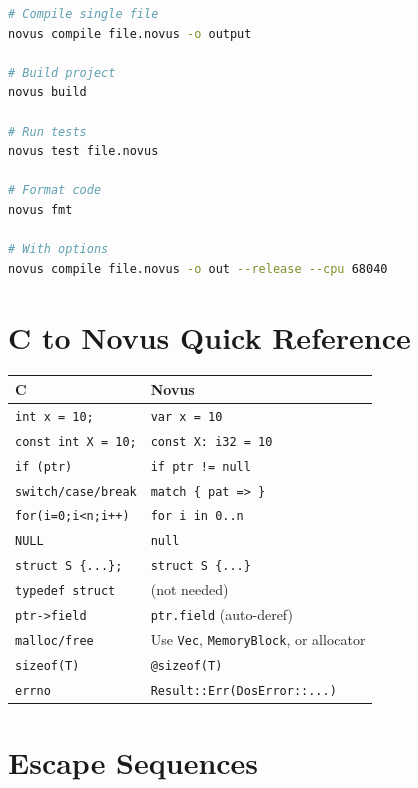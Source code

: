 \begin{lstlisting}[language=bash]
# Compile single file
novus compile file.novus -o output

# Build project
novus build

# Run tests
novus test file.novus

# Format code
novus fmt

# With options
novus compile file.novus -o out --release --cpu 68040
\end{lstlisting}

\section{C to Novus Quick Reference}

\begin{center}
\begin{tabular}{ll}
\textbf{C} & \textbf{Novus} \\
\hline
\texttt{int x = 10;} & \texttt{var x = 10} \\
\texttt{const int X = 10;} & \texttt{const X: i32 = 10} \\
\texttt{if (ptr)} & \texttt{if ptr != null} \\
\texttt{switch/case/break} & \texttt{match \{ pat => \}} \\
\texttt{for(i=0;i<n;i++)} & \texttt{for i in 0..n} \\
\texttt{NULL} & \texttt{null} \\
\texttt{struct S \{...\};} & \texttt{struct S \{...\}} \\
\texttt{typedef struct} & (not needed) \\
\texttt{ptr->field} & \texttt{ptr.field} (auto-deref) \\
\texttt{malloc/free} & Use \texttt{Vec}, \texttt{MemoryBlock}, or allocator \\
\texttt{sizeof(T)} & \texttt{@sizeof(T)} \\
\texttt{errno} & \texttt{Result::Err(DosError::...)} \\
\end{tabular}
\end{center}

\section{Escape Sequences}

